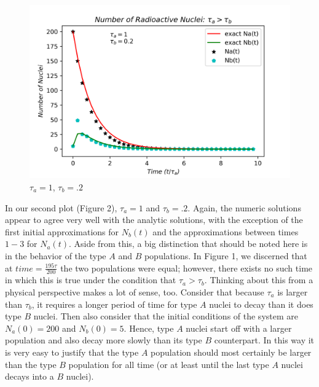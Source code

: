 \documentclass[twocolumn]{article}
\begin{document}
\begin{figure}[h]
\caption{$\tau_a = 1$, $\tau_b = .2$}
\centering
\includegraphics[scale=.6]{Radioactive_DecayAgreaterthanB}
\end{figure}
In our second plot (Figure 2), $\tau_a=1$ and $\tau_b=.2$. Again, the numeric solutions appear to  agree very well with the analytic solutions, with the exception of the first initial approximations for $N_b(t)$ and the approximations between times $1-3$ for $N_a(t)$. Aside from this, a big distinction that should be noted here is in the behavior of the type $A$ and $B$ populations. In Figure 1, we discerned that at $time=\frac{195\tau}{200}$ the two populations were equal; however, there exists no such time in which this is true under the condition that $\tau_a>\tau_b$. Thinking about this from a physical perspective makes a lot of sense, too. Consider that because $\tau_a$ is larger than $\tau_b$, it requires a longer period of time for type $A$ nuclei to decay than it does type $B$ nuclei. Then also consider that the initial conditions of the system are $N_a(0)=200$ and $N_b(0)=5$. Hence, type $A$ nuclei start off with a larger population and also decay more slowly than its type $B$ counterpart. In this way it is very easy to justify that the type $A$ population should most certainly be larger than the type $B$ population for all time (or at least until the last type $A$ nuclei decays into a $B$ nuclei).
\end{document}
